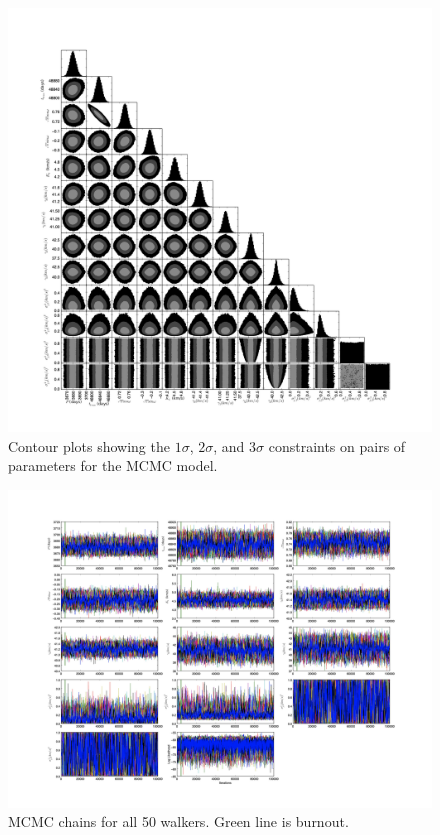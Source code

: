 \documentclass{article}
\begin{document}
\begin{figure}[!htb]
\centering
\includegraphics[width=\textwidth]{corner_100000_gammas.jpg}
\caption{Contour plots showing the $1 \sigma$, $2 \sigma$, and $3 \sigma$ constraints on pairs of parameters for the MCMC model.}
\end{figure}

\begin{figure}[!htb]
\centering
\includegraphics[width=\textwidth]{chainPlot_100000_gammas.jpg}
\caption{MCMC chains for all 50 walkers. Green line is burnout.}
\end{figure}
\end{document}
